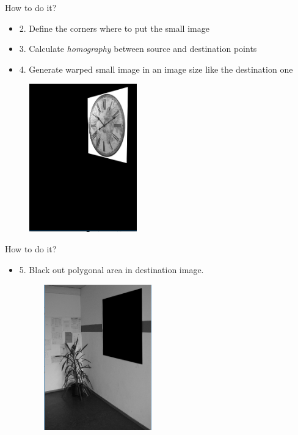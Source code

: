 \documentclass[xcolor={x11names,svgnames,dvipsnames},trans]{beamer}
\begin{document}
\begin{frame}{How to do it?}
    \begin{itemize}
        \item 2. Define the corners where to put the small image
        \item 3. Calculate \textit{homography} between source and destination points
        \item 4. Generate warped small image in an image size like the destination one
    \end{itemize}
    \begin{figure}
        \includegraphics[width=4.666cm]{images/clock-warped.jpg}
    \end{figure}
\end{frame}

\begin{frame}{How to do it?}
    \begin{itemize}
        \item 5. Black out polygonal area in destination image.
        \begin{figure}
            \includegraphics[width=4.666cm]{images/isle-black.PNG}
        \end{figure}
    \end{itemize}
\end{frame}
\end{document}
